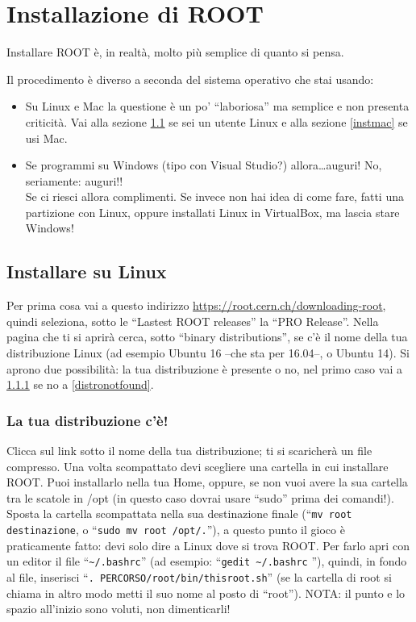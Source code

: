 \chapter{Installazione di ROOT}\label{instroot}
Installare ROOT è, in realtà, molto più semplice di quanto si pensa. 

Il procedimento è diverso a seconda del sistema operativo che stai usando:
\begin{itemize}
	\item Su Linux e Mac la questione è un po' ``laboriosa'' ma semplice e non presenta criticità. Vai alla sezione \ref{instlin} se sei un utente Linux e alla sezione \ref{instmac} se usi Mac.
	\item Se programmi su Windows (tipo con Visual Studio?) allora\ldots auguri! No, seriamente: auguri!! \\
	Se ci riesci allora complimenti. Se invece non hai idea di come fare, fatti una partizione con Linux, oppure installati Linux in VirtualBox, ma lascia stare Windows!
\end{itemize}

\section{Installare su Linux}\label{instlin}
Per prima cosa vai a questo indirizzo \url{https://root.cern.ch/downloading-root}, quindi seleziona, sotto le ``Lastest ROOT releases'' la ``PRO Release''. Nella pagina che ti si aprirà cerca, sotto ``binary distributions'', se c'è il nome della tua distribuzione Linux (ad esempio Ubuntu 16 --che sta per 16.04--, o Ubuntu 14). Si aprono due possibilità: la tua distribuzione è presente o no, nel primo caso vai a \ref{distrofound} se no a \ref{distronotfound}. 
\subsection{La tua distribuzione c'è!}\label{distrofound}
Clicca sul link sotto il nome della tua distribuzione; ti si scaricherà un file compresso. Una volta scompattato devi scegliere una cartella in cui installare ROOT. Puoi installarlo nella tua Home, oppure, se non vuoi avere la sua cartella tra le scatole in /opt (in questo caso dovrai usare ``sudo'' prima dei comandi!). Sposta la cartella scompattata nella sua destinazione finale (``\verb|mv root destinazione|, o ``\verb|sudo mv root /opt/.|''), a questo punto il gioco è praticamente fatto: devi solo dire a Linux dove si trova ROOT. Per farlo apri con un editor il file ``\verb|~/.bashrc|'' (ad esempio: ``\verb|gedit ~/.bashrc| ''), quindi, in fondo al file, inserisci ``\verb|. PERCORSO/root/bin/thisroot.sh|'' (se la cartella di root si chiama in altro modo metti il suo nome al posto di ``root''). NOTA: il punto e lo spazio all'inizio sono voluti, non dimenticarli!

